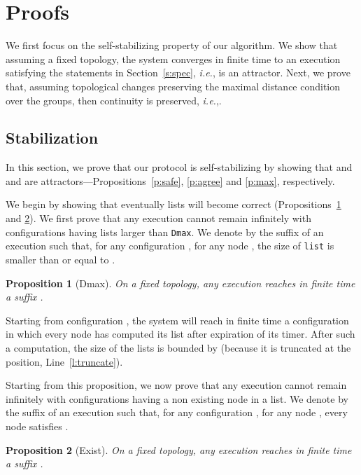 \documentclass[11pt,english]{article}
\newcommand{\Latin}[1]{\textit{#1}}
\newcommand{\ie}{\Latin{i.e.},\xspace}
\newtheorem{proposition}{Proposition}
\newenvironment{proof}[1][0cm]{
  \begin{list}{\bf Proof.~}{
      \setlength{\itemindent}{0cm}
      \setlength{\labelsep}{0cm}
      \setlength{\labelwidth}{#1}
      \setlength{\leftmargin}{#1}
    \item
    }
}{\hfill
  \end{list}
}
\begin{document}
\section{Proofs}\label{s:proof}


We first focus on the self-stabilizing property of our algorithm. We show that
assuming a fixed topology, the system converges in finite time to an execution
satisfying the statements in Section~\ref{s:spec}, \ie  is an attractor.  Next, we prove that, assuming topological
changes preserving the maximal distance condition over the groups, then
continuity is preserved, \ie .

\subsection{Stabilization}

In this section, we prove that our protocol is self-stabilizing by showing that
 and  and  are attractors---Propo\-sitions~\ref{p:safe}, \ref{p:agree} and \ref{p:max}, respectively.



We begin by showing that eventually lists will become correct
(Propositions~\ref{p:dmax} and \ref{p:exist}).
We first prove that any execution cannot remain infinitely with configurations
having lists larger than \texttt{Dmax}. We denote by  the
suffix of an execution  such that, for any configuration , for any node , the size of \texttt{list} is
smaller than or equal to .

\begin{proposition}[Dmax]\label{p:dmax}
On a fixed topology, any execution  reaches in finite time a suffix
.
\end{proposition}

\begin{proof}
Starting from configuration , the system will reach in finite time a
configuration in which every node has computed its list after expiration of its
timer. After such a computation, the size of the lists is bounded by
 (because it is truncated at the  position,
Line~\ref{l:truncate}).
\end{proof}


Starting from this proposition, we now prove that any execution cannot remain
infinitely with configurations having a non existing node in a list. We denote
by  the suffix of an execution  such that, for any
configuration , for any node , every node  satisfies .

\begin{proposition}[Exist]\label{p:exist}
On a fixed topology, any execution  reaches in finite time a suffix
.
\end{proposition}
\end{document}
